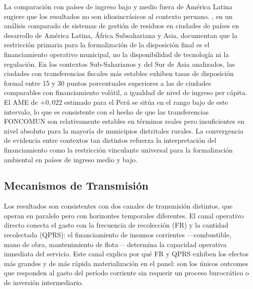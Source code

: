 La comparación con países de ingreso bajo y medio fuera de América Latina sugiere que los resultados no son idiosincrásicos al contexto peruano.
\citet{Guerrero2013}, en un análisis comparado de sistemas de gestión de residuos en ciudades de países en desarrollo de América Latina, África Subsahariana y Asia, documentan que la restricción primaria para la formalización de la disposición final es el financiamiento operativo municipal, no la disponibilidad de tecnología ni la regulación.
En los contextos Sub-Saharianos y del Sur de Asia analizados, las ciudades con transferencias fiscales más estables exhiben tasas de disposición formal entre 15 y 30 puntos porcentuales superiores a las de ciudades comparables con financiamiento volátil, a igualdad de nivel de ingreso per cápita.
El AME de $+0{,}022$ estimado para el Perú se sitúa en el rango bajo de este intervalo, lo que es consistente con el hecho de que las transferencias FONCOMUN son relativamente estables en términos reales pero insuficientes en nivel absoluto para la mayoría de municipios distritales rurales.
La convergencia de evidencia entre contextos tan distintos refuerza la interpretación del financiamiento como la restricción vinculante universal para la formalización ambiental en países de ingreso medio y bajo.

\subsection{Mecanismos de Transmisión}
\label{sec:mecanismos}

Los resultados son consistentes con dos canales de transmisión distintos, que operan en paralelo pero con horizontes temporales diferentes. El canal operativo directo conecta el gasto con la frecuencia de recolección (FR) y la cantidad recolectada (QPRS): el financiamiento de insumos corrientes ---combustible, mano de obra, mantenimiento de flota--- determina la capacidad operativa inmediata del servicio. Este canal explica por qué FR y QPRS exhiben los efectos más grandes y de más rápida materialización en el panel: son los únicos outcomes que responden al gasto del período corriente sin requerir un proceso burocrático o de inversión intermediario.

